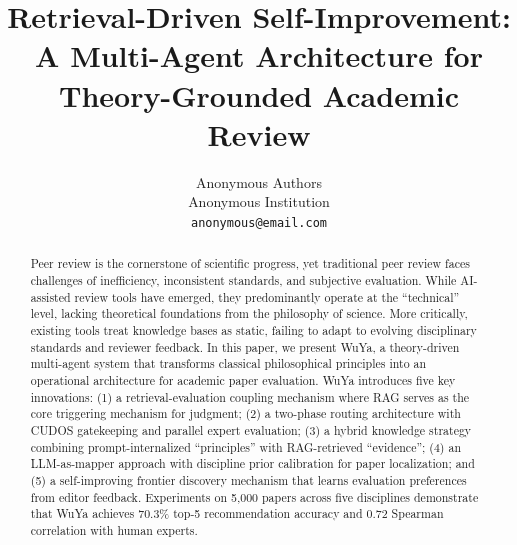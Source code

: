 \documentclass[11pt,a4paper]{article}
\title{Retrieval-Driven Self-Improvement: A Multi-Agent Architecture for Theory-Grounded Academic Review}
\author{
    Anonymous Authors\\
    \normalsize Anonymous Institution\\
    \normalsize \texttt{anonymous@email.com}
}
\date{}
\newcommand{\rag}{RAG}
\begin{document}
\maketitle

\begin{abstract}
Peer review is the cornerstone of scientific progress, yet traditional peer review faces challenges of inefficiency, inconsistent standards, and subjective evaluation. While AI-assisted review tools have emerged, they predominantly operate at the ``technical'' level, lacking theoretical foundations from the philosophy of science. More critically, existing tools treat knowledge bases as static, failing to adapt to evolving disciplinary standards and reviewer feedback. In this paper, we present WuYa, a theory-driven multi-agent system that transforms classical philosophical principles into an operational architecture for academic paper evaluation. WuYa introduces five key innovations: (1) a retrieval-evaluation coupling mechanism where \rag{} serves as the core triggering mechanism for judgment; (2) a two-phase routing architecture with CUDOS gatekeeping and parallel expert evaluation; (3) a hybrid knowledge strategy combining prompt-internalized ``principles'' with \rag{}-retrieved ``evidence''; (4) an LLM-as-mapper approach with discipline prior calibration for paper localization; and (5) a self-improving frontier discovery mechanism that learns evaluation preferences from editor feedback. Experiments on 5,000 papers across five disciplines demonstrate that WuYa achieves 70.3\% top-5 recommendation accuracy and 0.72 Spearman correlation with human experts.
\end{abstract}


















\end{document}
